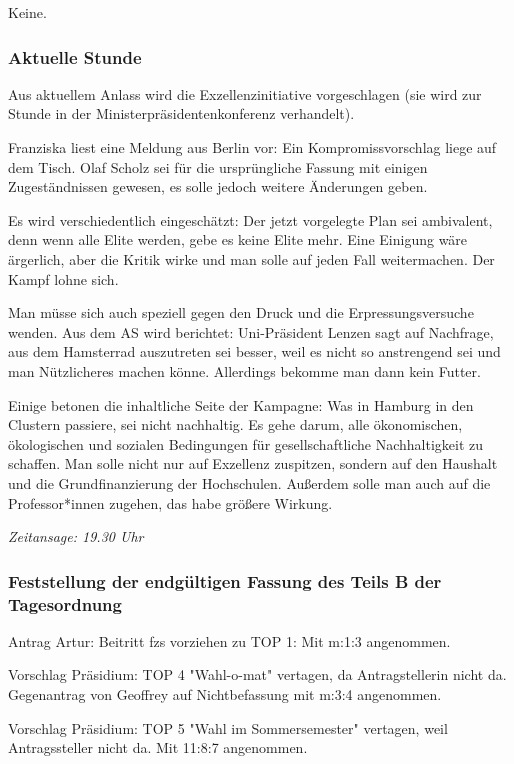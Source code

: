 \documentclass[ngerman,headheight=70pt]{scrartcl}
\begin{document}
    Keine.

    \subsubsection{Aktuelle Stunde}

    Aus aktuellem Anlass wird die Exzellenzinitiative vorgeschlagen (sie wird
    zur Stunde in der Ministerpräsidentenkonferenz verhandelt).

    Franziska liest eine Meldung aus Berlin vor: Ein Kompromissvorschlag liege
    auf dem Tisch. Olaf Scholz sei für die ursprüngliche Fassung mit einigen
    Zugeständnissen gewesen, es solle jedoch weitere Änderungen geben.

    Es wird verschiedentlich eingeschätzt: Der jetzt vorgelegte Plan sei
    ambivalent, denn wenn alle Elite werden, gebe es keine Elite mehr. Eine
    Einigung wäre ärgerlich, aber die Kritik wirke und man solle auf jeden Fall
    weitermachen. Der Kampf lohne sich.

    Man müsse sich auch speziell gegen den Druck und die Erpressungsversuche
    wenden. Aus dem AS wird berichtet: Uni-Präsident Lenzen sagt auf Nachfrage,
    aus dem Hamsterrad auszutreten sei besser, weil es nicht so anstrengend sei
    und man Nützlicheres machen könne. Allerdings bekomme man dann kein Futter.

    Einige betonen die inhaltliche Seite der Kampagne: Was in Hamburg in den
    Clustern passiere, sei nicht nachhaltig. Es gehe darum, alle ökonomischen,
    ökologischen und sozialen Bedingungen für gesellschaftliche Nachhaltigkeit
    zu schaffen. Man solle nicht nur auf Exzellenz zuspitzen, sondern auf den
    Haushalt und die Grundfinanzierung der Hochschulen. Außerdem solle man auch
    auf die Professor*innen zugehen, das habe größere Wirkung.

    \textit{Zeitansage: 19.30 Uhr}

    \subsubsection{Feststellung der endgültigen Fassung des Teils B der Tagesordnung}

    Antrag Artur: Beitritt fzs vorziehen zu TOP 1: Mit m:1:3 angenommen.

    Vorschlag Präsidium: TOP 4 "Wahl-o-mat" vertagen, da Antragstellerin nicht da.
    Gegenantrag von Geoffrey auf Nichtbefassung mit m:3:4 angenommen.

    Vorschlag Präsidium: TOP 5 "Wahl im Sommersemester" vertagen, weil
    Antragssteller nicht da. Mit 11:8:7 angenommen.
\end{document}

